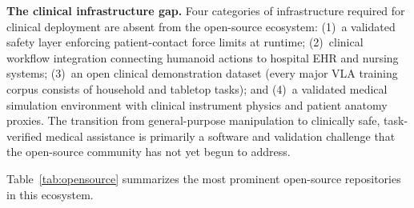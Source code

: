 \textbf{The clinical infrastructure gap.} Four categories of infrastructure
required for clinical deployment are absent from the open-source ecosystem:
(1)~a validated safety layer enforcing patient-contact force limits at runtime;
(2)~clinical workflow integration connecting humanoid actions to hospital EHR
and nursing systems; (3)~an open clinical demonstration dataset (every major
VLA training corpus consists of household and tabletop tasks); and (4)~a validated
medical simulation environment with clinical instrument physics and patient
anatomy proxies. The transition from general-purpose manipulation to clinically
safe, task-verified medical assistance is primarily a software and validation
challenge that the open-source community has not yet begun to address.

Table~\ref{tab:opensource} summarizes the most prominent open-source repositories
in this ecosystem.


